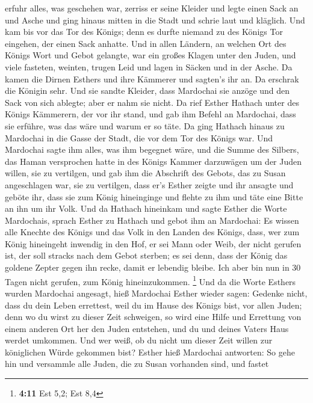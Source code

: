 erfuhr alles, was geschehen war, zerriss er seine Kleider und legte
einen Sack an und Asche und ging hinaus mitten in die Stadt und schrie
laut und kläglich.  Und kam bis vor das Tor des Königs;
denn es durfte niemand zu des Königs Tor eingehen, der einen Sack
anhatte.  Und in allen Ländern, an welchen Ort des Königs
Wort und Gebot gelangte, war ein großes Klagen unter den Juden, und
viele fasteten, weinten, trugen Leid und lagen in Säcken und in der
Asche.  Da kamen die Dirnen Esthers und ihre Kämmerer und
sagten's ihr an. Da erschrak die Königin sehr. Und sie sandte Kleider,
dass Mardochai sie anzöge und den Sack von sich ablegte; aber er nahm
sie nicht.  Da rief Esther Hathach unter des Königs
Kämmerern, der vor ihr stand, und gab ihm Befehl an Mardochai, dass sie
erführe, was das wäre und warum er so täte.  Da ging
Hathach hinaus zu Mardochai in die Gasse der Stadt, die vor dem Tor des
Königs war.  Und Mardochai sagte ihm alles, was ihm
begegnet wäre, und die Summe des Silbers, das Haman versprochen hatte in
des Königs Kammer darzuwägen um der Juden willen, sie zu vertilgen,
 und gab ihm die Abschrift des Gebots, das zu Susan
angeschlagen war, sie zu vertilgen, dass er's Esther zeigte und ihr
ansagte und geböte ihr, dass sie zum König hineinginge und flehte zu ihm
und täte eine Bitte an ihn um ihr Volk.  Und da Hathach
hineinkam und sagte Esther die Worte Mardochais,  sprach
Esther zu Hathach und gebot ihm an Mardochai:  Es wissen
alle Knechte des Königs und das Volk in den Landen des Königs, dass, wer
zum König hineingeht inwendig in den Hof, er sei Mann oder Weib, der
nicht gerufen ist, der soll stracks nach dem Gebot sterben; es sei denn,
dass der König das goldene Zepter gegen ihn recke, damit er lebendig
bleibe. Ich aber bin nun in 30 Tagen nicht gerufen, zum König
hineinzukommen. \footnote{\textbf{4:11} Est 5,2; Est 8,4}
 Und da die Worte Esthers wurden Mardochai angesagt,
 hieß Mardochai Esther wieder sagen: Gedenke nicht, dass
du dein Leben errettest, weil du im Hause des Königs bist, vor allen
Juden;  denn wo du wirst zu dieser Zeit schweigen, so
wird eine Hilfe und Errettung von einem anderen Ort her den Juden
entstehen, und du und deines Vaters Haus werdet umkommen. Und wer weiß,
ob du nicht um dieser Zeit willen zur königlichen Würde gekommen bist?
 Esther hieß Mardochai antworten:  So gehe
hin und versammle alle Juden, die zu Susan vorhanden sind, und fastet
